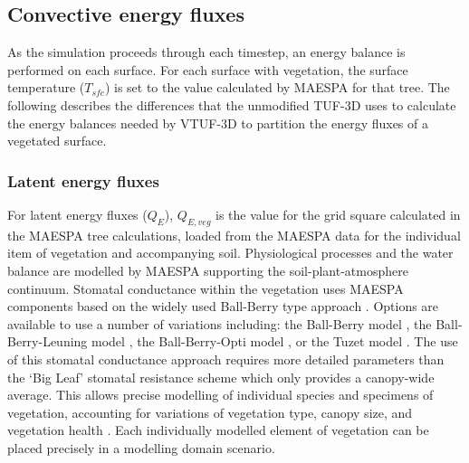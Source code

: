 \documentclass[final,3p,times,authoryear]{elsarticle}
\begin{document}


\subsection{Convective energy fluxes}

As the simulation proceeds through each timestep, an energy balance is performed on each surface. For each surface with vegetation, the surface temperature ($T_{sfc}$) is set to the value calculated by MAESPA for that tree. The following describes the differences that the unmodified TUF-3D uses to calculate the energy balances needed by VTUF-3D to partition the energy fluxes of a vegetated surface.

\subsubsection{Latent energy fluxes}
\label{sec:calcleaftemp}

For latent energy fluxes ($Q_{E}$), $Q_{E,veg}$ is the value for the grid square calculated in the MAESPA tree calculations, loaded from the MAESPA data for the individual item of vegetation and accompanying soil. Physiological processes and the water balance are modelled by MAESPA supporting the soil-plant-atmosphere continuum. Stomatal conductance within the vegetation uses MAESPA components based on the widely used Ball-Berry type approach \citep{Ball1987,Duursma2012}. Options are available to use a number of variations including: the Ball-Berry model \citep{Ball1987}, the Ball-Berry-Leuning model \citep{Leuning1995}, the Ball-Berry-Opti model \citep{Medlyn2011}, or the Tuzet model \citep{Tuzet2003}. The use of this stomatal conductance approach requires more detailed parameters than the `Big Leaf' stomatal resistance scheme \citep{Bailey1981,Kowalczyk1991} which only provides a canopy-wide average. This allows precise modelling of individual species and specimens of vegetation, accounting for variations of vegetation type, canopy size, and vegetation health \citep{Duursma2012}. Each individually modelled element of vegetation can be placed precisely in a modelling domain scenario.
\end{document}

